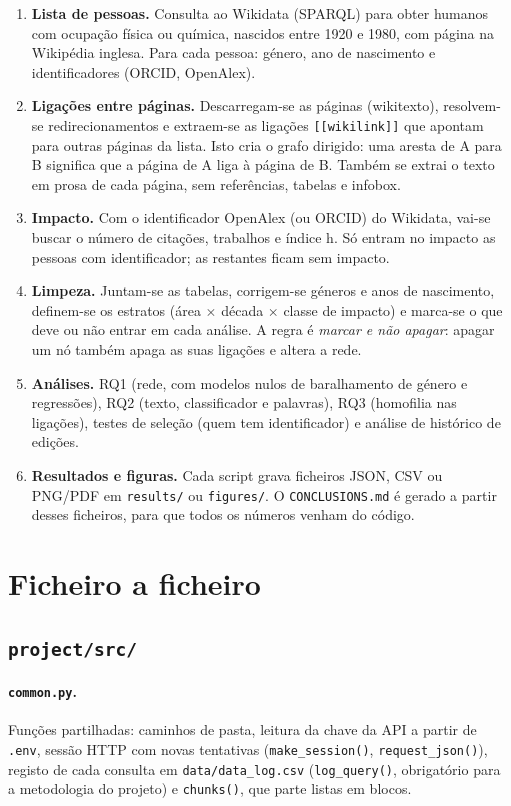 \documentclass[11pt,a4paper]{article}
\newcommand{\file}[1]{\texttt{#1}}
\newcommand{\fn}[1]{\texttt{#1()}}
\begin{document}
\begin{enumerate}
  \item \textbf{Lista de pessoas.} Consulta ao Wikidata (SPARQL) para obter humanos com ocupação física ou química, nascidos entre 1920 e 1980, com página na Wikipédia inglesa. Para cada pessoa: género, ano de nascimento e identificadores (ORCID, OpenAlex).
  \item \textbf{Ligações entre páginas.} Descarregam-se as páginas (wikitexto), resolvem-se redirecionamentos e extraem-se as ligações \texttt{[[wikilink]]} que apontam para outras páginas da lista. Isto cria o grafo dirigido: uma aresta de A para B significa que a página de A liga à página de B. Também se extrai o texto em prosa de cada página, sem referências, tabelas e infobox.
  \item \textbf{Impacto.} Com o identificador OpenAlex (ou ORCID) do Wikidata, vai-se buscar o número de citações, trabalhos e índice h. Só entram no impacto as pessoas com identificador; as restantes ficam sem impacto.
  \item \textbf{Limpeza.} Juntam-se as tabelas, corrigem-se géneros e anos de nascimento, definem-se os estratos (área $\times$ década $\times$ classe de impacto) e marca-se o que deve ou não entrar em cada análise. A regra é \emph{marcar e não apagar}: apagar um nó também apaga as suas ligações e altera a rede.
  \item \textbf{Análises.} RQ1 (rede, com modelos nulos de baralhamento de género e regressões), RQ2 (texto, classificador e palavras), RQ3 (homofilia nas ligações), testes de seleção (quem tem identificador) e análise de histórico de edições.
  \item \textbf{Resultados e figuras.} Cada script grava ficheiros JSON, CSV ou PNG/PDF em \file{results/} ou \file{figures/}. O \file{CONCLUSIONS.md} é gerado a partir desses ficheiros, para que todos os números venham do código.
\end{enumerate}

\section{Ficheiro a ficheiro}

\subsection{\file{project/src/}}

\paragraph{\file{common.py}.} Funções partilhadas: caminhos de pasta, leitura da chave da API a partir de \file{.env}, sessão HTTP com novas tentativas (\fn{make_session}, \fn{request_json}), registo de cada consulta em \file{data/data_log.csv} (\fn{log_query}, obrigatório para a metodologia do projeto) e \fn{chunks}, que parte listas em blocos.
\end{document}
